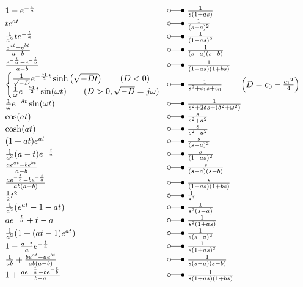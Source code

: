 \begin{footnotesize}
\[ \begin{array}{@{}l@{ ~ \laplace ~ }l@{}}
1 - e^{-\frac{t}{a}} &
    \frac{1}{s (1 + as)} \\
t e^{at} &
    \frac{1}{(s - a)^2} \\
\frac{1}{a^2} t e^{-\frac{t}{a}} &
    \frac{1}{(1 + as)^2} \\
\frac{e^{at} - e^{bt}}{a - b} &
    \frac{1}{(s - a) (s - b)} \\
\frac{e^{-\frac{t}{a}} - e^{-\frac{t}{b}}}{a - b} &
    \frac{1}{(1 + as) (1 + bs)} \\
\left\lbrace\begin{array}{@{}l}
\frac{1}{\sqrt{-D}} e^{-\frac{c_1}{2}t} \sinh\left(\sqrt{-Dt}\right) \qquad (D < 0) \\
\frac{1}{\omega} e^{-\frac{c_1}{2}t} \sin(\omega t)                  \qquad (D > 0, \sqrt{-D} = j \omega)
\end{array}\right. &
    \frac{1}{s^2 + c_1 s + c_0} \qquad \left(D = c_0 - \frac{{c_1}^2}{4}\right) \\
\frac{1}{\omega} e^{-\delta t} \sin(\omega t) &
    \frac{1}{s^2 + 2 \delta s + (\delta^2 + \omega^2)} \\
\cos(a t) &
    \frac{s}{s^2 + a^2} \\
\cosh(a t) &
    \frac{s}{s^2 - a^2} \\
(1 + a t) e^{a t} &
    \frac{s}{(s - a)^2} \\
\frac{1}{a^3} (a - t) e^{-\frac{t}{a}} &
    \frac{s}{(1 + as)^2} \\
\frac{a e^{a t} - b e^{b t}}{a - b} &
    \frac{s}{(s - a) (s - b)} \\
\frac{a e^{-\frac{t}{b}} - b e^{-\frac{t}{a}}}{a b (a - b)} &
    \frac{s}{(1 + as) (1 + bs)} \\
\frac{1}{2} t^2 &
    \frac{1}{s^3} \\
\frac{1}{a^2} (e^{at} - 1 - at) &
    \frac{1}{s^2 (s - a)} \\
a e^{-\frac{t}{a}} + t - a &
    \frac{1}{s^2 (1 + a s)} \\
\frac{1}{a^2} (1 + (a t - 1) e^{a t}) &
    \frac{1}{s (s - a)^2} \\
1 - \frac{a + t}{a} e^{-\frac{t}{a}} &
    \frac{1}{s (1 + as)^2} \\
\frac{1}{ab} + \frac{b e^{at} - a e^{bt}}{ab (a - b)} &
    \frac{1}{s (s - a) (s - b)} \\
1 + \frac{a e^{-\frac{t}{a}} - b e^{-\frac{t}{b}}}{b - a} &
    \frac{1}{s (1 + as) (1 + bs)} \\
\end{array} \]


\end{footnotesize}
